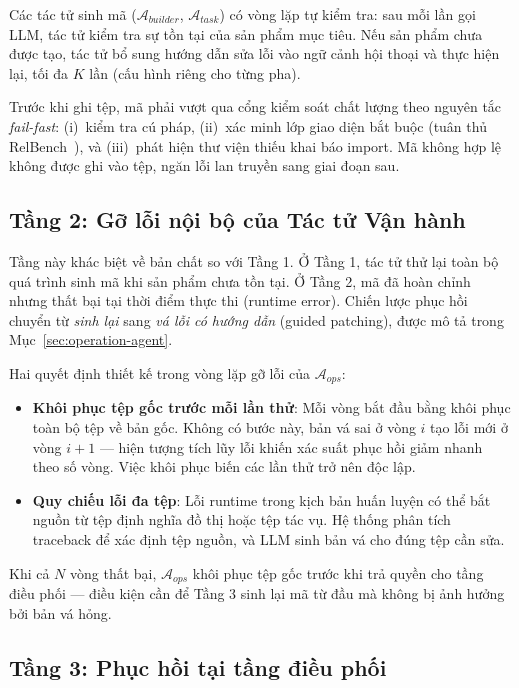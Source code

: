 Các tác tử sinh mã ($\mathcal{A}_{builder}$, $\mathcal{A}_{task}$) có vòng lặp tự kiểm tra: sau mỗi lần gọi LLM, tác tử kiểm tra sự tồn tại của sản phẩm mục tiêu. Nếu sản phẩm chưa được tạo, tác tử bổ sung hướng dẫn sửa lỗi vào ngữ cảnh hội thoại và thực hiện lại, tối đa $K$ lần (cấu hình riêng cho từng pha).

Trước khi ghi tệp, mã phải vượt qua cổng kiểm soát chất lượng theo nguyên tắc \textit{fail-fast}: (i)~kiểm tra cú pháp, (ii)~xác minh lớp giao diện bắt buộc (tuân thủ RelBench~\cite{robinson2024relbench}), và (iii)~phát hiện thư viện thiếu khai báo import. Mã không hợp lệ không được ghi vào tệp, ngăn lỗi lan truyền sang giai đoạn sau.

\subsection{Tầng 2: Gỡ lỗi nội bộ của Tác tử Vận hành}

Tầng này khác biệt về bản chất so với Tầng 1. Ở Tầng 1, tác tử thử lại toàn bộ quá trình sinh mã khi sản phẩm chưa tồn tại. Ở Tầng 2, mã đã hoàn chỉnh nhưng thất bại tại thời điểm thực thi (runtime error). Chiến lược phục hồi chuyển từ \textit{sinh lại} sang \textit{vá lỗi có hướng dẫn} (guided patching), được mô tả trong Mục~\ref{sec:operation-agent}.

Hai quyết định thiết kế trong vòng lặp gỡ lỗi của $\mathcal{A}_{ops}$:

\begin{itemize}
    \item \textbf{Khôi phục tệp gốc trước mỗi lần thử}: Mỗi vòng bắt đầu bằng khôi phục toàn bộ tệp về bản gốc. Không có bước này, bản vá sai ở vòng $i$ tạo lỗi mới ở vòng $i{+}1$ --- hiện tượng tích lũy lỗi khiến xác suất phục hồi giảm nhanh theo số vòng. Việc khôi phục biến các lần thử trở nên độc lập.
    \item \textbf{Quy chiếu lỗi đa tệp}: Lỗi runtime trong kịch bản huấn luyện có thể bắt nguồn từ tệp định nghĩa đồ thị hoặc tệp tác vụ. Hệ thống phân tích traceback để xác định tệp nguồn, và LLM sinh bản vá cho đúng tệp cần sửa.
\end{itemize}

Khi cả $N$ vòng thất bại, $\mathcal{A}_{ops}$ khôi phục tệp gốc trước khi trả quyền cho tầng điều phối --- điều kiện cần để Tầng 3 sinh lại mã từ đầu mà không bị ảnh hưởng bởi bản vá hỏng.

\subsection{Tầng 3: Phục hồi tại tầng điều phối}

